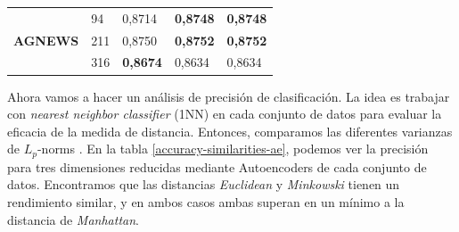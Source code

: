 \begin{table}[!h]
\begin{tabular}{|l|l|l|l|l|}
\multirow{3}{*}{\textbf{AGNEWS}}   & 94                                 & 0,8714                            & \textbf{0,8748}                        & \textbf{0,8748}                                     \\ \cline{2-5} 
                                   & 211                                & 0,8750                          & \textbf{0,8752}                          & \textbf{0,8752}                                     \\ \cline{2-5} 
                                   & 316                                & \textbf{0,8674}                            & 0,8634                        & 0,8634                                     \\ \hline
\end{tabular}
\end{table}
Ahora vamos a hacer un análisis de precisión de clasificación. La idea es trabajar con \textit{nearest neighbor classifier} (1NN) en cada conjunto de datos para evaluar la eficacia de la medida de distancia. Entonces, comparamos las diferentes varianzas de $ L_p $-norms \cite{sutherland1975introduction}. En la tabla \ref{accuracy-similarities-ae}, podemos ver la precisión para tres dimensiones reducidas mediante Autoencoders de cada conjunto de datos. Encontramos que las distancias \textit{Euclidean} \cite{Gower82} y \textit{Minkowski} tienen un rendimiento similar, y en ambos casos ambas superan en un mínimo a la distancia de \textit{Manhattan}.

